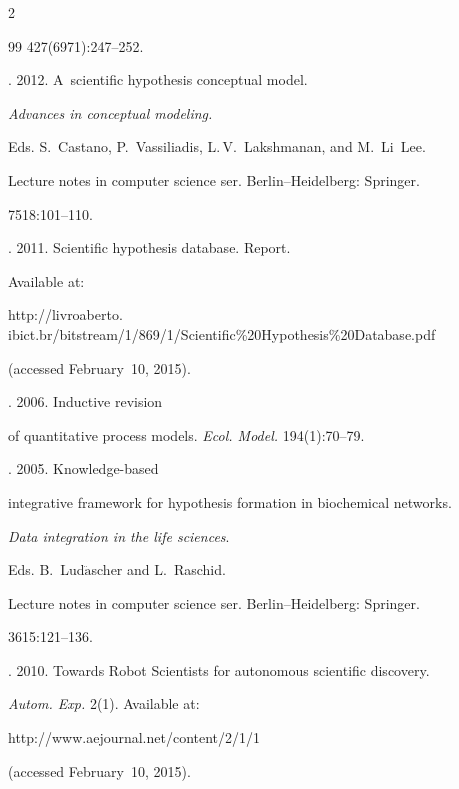 \begin{multicols}{2}
{{\begin{thebibliography}{99}
427(6971):247--252.




. 2012. A~scientific hypothesis conceptual model.


\textit{Advances in conceptual modeling.}


Eds. S.~Castano, P.~Vassiliadis, L.\,V.~Lakshmanan, and M.~Li~Lee.


Lecture notes in computer science ser. Berlin--Heidelberg: Springer.


 7518:101--110.




. 2011. Scientific hypothesis database. Report.


Available at: {\sf


http://livroaberto. ibict.br/bitstream/1/869/1/Scientific\%20Hypothesis\%\linebreak 20Database.pdf} (accessed February~10, 2015).




. 2006. Inductive revision


of quantitative process models. \textit{Ecol. Model.} 194(1):70--79.




. 2005. Knowledge-based


integrative framework for hypothesis formation in biochemical networks.


\textit{Data integration in the life sciences}.


Eds. B.~Lud$\ddot{\mbox{a}}$scher and L.~Raschid.


Lecture notes in computer science ser. Berlin--Heidelberg: Springer.


3615:121--136.




. 2010. Towards Robot Scientists for autonomous scientific discovery.


\textit{Autom. Exp.} 2(1). Available at: {\sf


http://www.aejournal.net/content/2/1/1} (accessed February~10, 2015).



\end{thebibliography}}}
\end{multicols}
